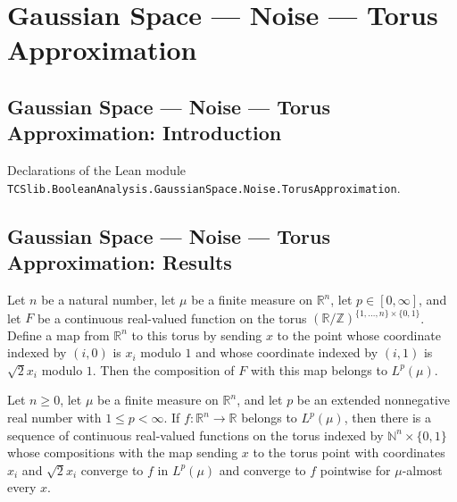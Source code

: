\section{Gaussian Space --- Noise --- Torus Approximation}
\subsection*{Gaussian Space --- Noise --- Torus Approximation: Introduction}

Declarations of the Lean module \texttt{TCSlib.BooleanAnalysis.GaussianSpace.Noise.TorusApproximation}.

\subsection*{Gaussian Space --- Noise --- Torus Approximation: Results}

\begin{lemma}
\label{BooleanAnalysis.GaussianSpace.memLp_gaussianTorusPullback}
\leanok
{}
Let $n$ be a natural number, let $\mu$ be a finite measure on $\mathbb R^n$, let
$p\in[0,\infty]$, and let $F$ be a continuous real-valued function on the torus
$(\mathbb R/\mathbb Z)^{\{1,\ldots,n\}\times\{0,1\}}$. Define a map from $\mathbb R^n$
to this torus by sending $x$ to the point whose coordinate indexed by $(i,0)$ is $x_i$
modulo $1$ and whose coordinate indexed by $(i,1)$ is $\sqrt2 x_i$ modulo $1$. Then the
composition of $F$ with this map belongs to $L^p(\mu)$.
\end{lemma}

\begin{lemma}
\label{BooleanAnalysis.GaussianSpace.exists_gaussianTorus_approximation}
\leanok
{}
Let $n\ge0$, let $\mu$ be a finite measure on $\mathbb R^n$, and let $p$ be an extended
nonnegative real number with $1\le p<\infty$. If $f:\mathbb R^n\to\mathbb R$ belongs to
$L^p(\mu)$, then there is a sequence of continuous real-valued functions on the torus
indexed by $\mathbb N^n\times\{0,1\}$ whose compositions with the map sending $x$ to the
torus point with coordinates $x_i$ and $\sqrt2 x_i$ converge to $f$ in $L^p(\mu)$ and
converge to $f$ pointwise for $\mu$-almost every $x$.
\end{lemma}
